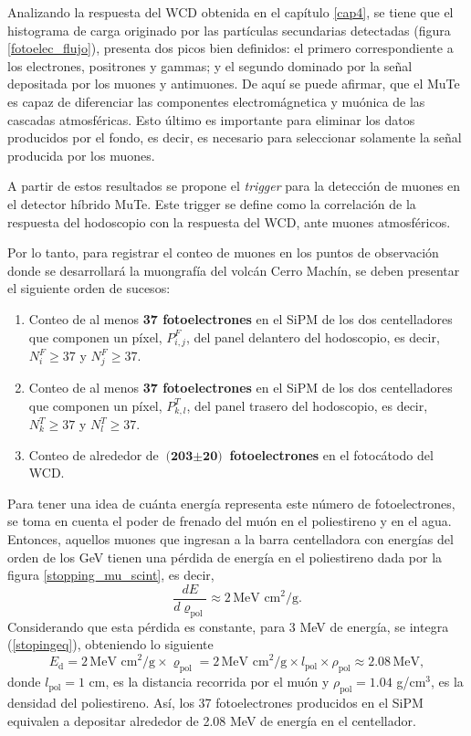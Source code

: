 \documentclass[12pt,oneside,openany,letter]{book}
\begin{document}
Analizando la respuesta del WCD obtenida en el capítulo \ref{cap4}, se tiene que el histograma de carga originado por las partículas secundarias detectadas (figura \ref{fotoelec_flujo}), presenta dos picos bien definidos: el primero correspondiente a los electrones, positrones y gammas; y el segundo dominado por la señal depositada por los muones y antimuones. De aquí se puede afirmar, que el MuTe es capaz de diferenciar las componentes electromágnetica y muónica de las cascadas atmosféricas. Esto \'ultimo es importante para eliminar los datos producidos por el fondo, es decir, es necesario para seleccionar solamente la se\~nal producida por los muones. 

A partir de estos resultados se propone el \textit{trigger} para la detección de muones en el detector híbrido MuTe. Este trigger se define como la correlación de la respuesta del hodoscopio con la respuesta del WCD, ante muones atmosféricos. 

Por lo tanto, para registrar el conteo de muones en los puntos de observación donde se desarrollará la muongrafía del volcán Cerro Machín, se deben presentar el siguiente orden de sucesos: 

\begin{enumerate}
\item Conteo de al menos \textbf{37 fotoelectrones} en el SiPM de los dos centelladores que componen un píxel, $P^F_{i,j}$, del panel delantero del hodoscopio, es decir, $N^F_{i} \geq 37$ y $N^F_{j} \geq 37$.
\item Conteo de al menos \textbf{37 fotoelectrones} en el SiPM de los dos centelladores que componen un píxel, $P^T_{k,l}$, del panel trasero del hodoscopio, es decir, $N^T_{k} \geq 37$ y $N^T_{l} \geq 37$.
\item Conteo de alrededor de $\textbf{(203$\pm$20)}$ \textbf{fotoelectrones} en el fotocátodo del WCD. 
\end{enumerate}

Para tener una idea de cuánta energía representa este número de fotoelectrones, se toma en cuenta el poder de frenado del muón en el poliestireno y en el agua. Entonces, aquellos muones que ingresan a la barra centelladora con energías del orden de los GeV tienen una p\'erdida de energ\'ia en el poliestireno dada por la figura \ref{stopping_mu_scint}, es decir,  
\begin{equation}
\label{stopingeq}
\frac{dE}{d\varrho_\mathrm{pol}}\approx 2 \,\text{MeV cm}^2\text{/g}.
\end{equation}
Considerando que esta p\'erdida es constante, para 3 MeV de energ\'ia, se integra (\ref{stopingeq}), obteniendo lo siguiente
\begin{equation}
E_\mathrm{d} = 2 \,\text{MeV cm}^2\text{/g} \times \varrho_\mathrm{pol} = 2 \,\text{MeV cm}^2\text{/g} \times l_\mathrm{pol} \times \rho_\mathrm{pol} \approx  \text{2.08} \, \text{MeV},
\end{equation}
donde $l_\mathrm{pol}=1$ cm, es la distancia recorrida por el mu\'on y $\rho_\mathrm{pol}=1.04$ g/cm$^3$, es la densidad del poliestireno. As\'i, los 37 fotoelectrones producidos en el SiPM equivalen a depositar alrededor de 2.08 MeV de energía en el centellador. 
\end{document}
